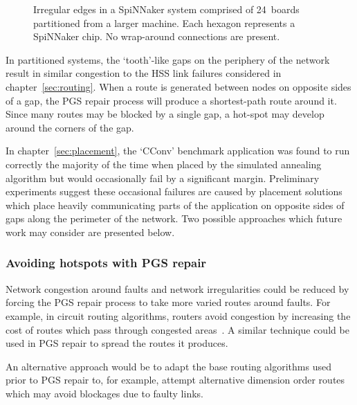 			\begin{figure}
				\center
				
				\caption[Irregular edges of a partitioned SpiNNaker system.]%
				{Irregular edges in a SpiNNaker system comprised of 24~boards
				partitioned from a larger machine.  Each hexagon represents a SpiNNaker
				chip. No wrap-around connections are present.}
				\label{fig:spalloc-mesh}
			\end{figure}
			
			In partitioned systems, the `tooth'-like gaps on the periphery of the
			network result in similar congestion to the HSS link failures considered
			in chapter~\ref{sec:routing}. When a route is generated between nodes on
			opposite sides of a gap, the PGS repair process will produce a
			shortest-path route around it. Since many routes may be blocked by a
			single gap, a hot-spot may develop around the corners of the gap.
			
			In chapter~\ref{sec:placement}, the `CConv' benchmark application was
			found to run correctly the majority of the time when placed by the
			simulated annealing algorithm but would occasionally fail by a
			significant margin. Preliminary experiments suggest these occasional
			failures are caused by placement solutions which place heavily
			communicating parts of the application on opposite sides of gaps along
			the perimeter of the network. Two possible approaches which future work
			may consider are presented below.
			
			\subsubsection{Avoiding hotspots with PGS repair}
				
				\label{sec:pgs-repair-improvements}	
				
				Network congestion around faults and network irregularities could be
				reduced by forcing the PGS repair process to take more varied routes
				around faults. For example, in circuit routing algorithms, routers
				avoid congestion by increasing the cost of routes which pass through
				congested areas~\cite{kahng11}. A similar technique could be used in
				PGS repair to spread the routes it produces.
				
				An alternative approach would be to adapt the base routing algorithms
				used prior to PGS repair to, for example, attempt alternative dimension
				order routes which may avoid blockages due to faulty links.
			
